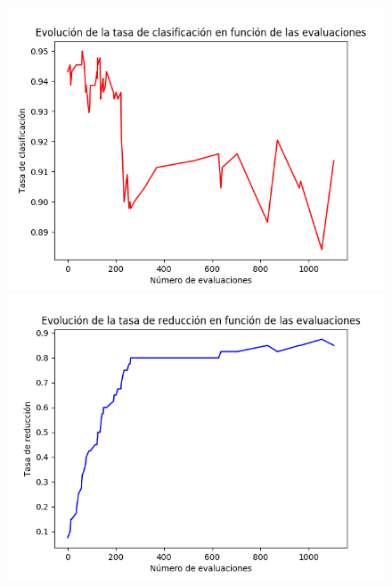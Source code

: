 \documentclass[11pt,a4paper]{article}
\begin{document}
\begin{figure}[H]
\centering
\begin{minipage}{.5\textwidth}
	\centering
	\includegraphics[scale=0.43]{img/acc_localr.png}
\end{minipage}%
\begin{minipage}{.5\textwidth}
	\centering
	\includegraphics[scale=0.43]{img/red_localr.png}
\end{minipage}
\end{figure}
\end{document}
